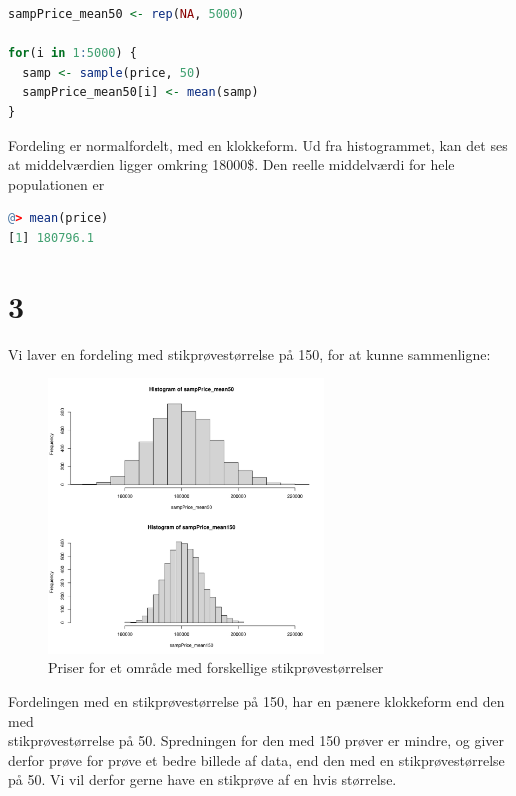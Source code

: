 \documentclass{article}
\begin{document}
\begin{lstlisting}[basicstyle=\ttfamily, language=R,
keywordstyle=\color{blue}\bfseries, rulecolor=\color{black}, stringstyle=\color{green}]
sampPrice_mean50 <- rep(NA, 5000)

for(i in 1:5000) {
  samp <- sample(price, 50)
  sampPrice_mean50[i] <- mean(samp)
}
\end{lstlisting}
Fordeling er normalfordelt, med en klokkeform. Ud fra histogrammet, kan det ses
at middelværdien ligger omkring 18000\$. Den reelle middelværdi for hele
populationen er 
\begin{lstlisting}[basicstyle=\ttfamily, language=R, keywordstyle=\color{blue}\bfseries, rulecolor=\color{black}]
@> mean(price)
[1] 180796.1
\end{lstlisting}

\section{3}
Vi laver en fordeling med stikprøvestørrelse på 150, for at kunne sammenligne:
\begin{figure}[H]
  \centering
  \includegraphics[width=0.65\textwidth]{../pricesample_means_all.pdf}
  \caption{Priser for et område med forskellige stikprøvestørrelser}
\end{figure}
Fordelingen med en stikprøvestørrelse på 150, har en pænere klokkeform end den
med \\stikprøvestørrelse på 50. Spredningen for den med 150 prøver er mindre, og
giver derfor prøve for prøve et bedre billede af data, end den med en
stikprøvestørrelse på 50. Vi vil derfor gerne have en stikprøve af en hvis
størrelse. 
\end{document}
